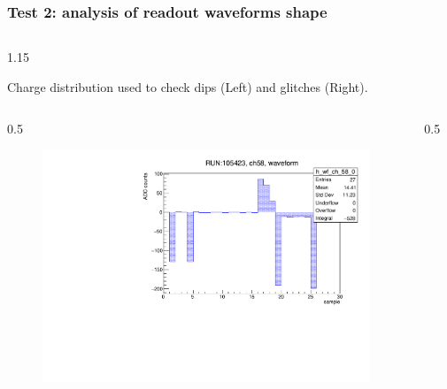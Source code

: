 \documentclass{beamer}
\begin{document}
\begin{frame}
    \frametitle{Test 2: analysis of readout waveforms shape}
            \vspace{-4mm}
        \begin{columns}
    \begin{column}{1.15\framewidth}
        \setlength{\leftmargini}{1.2em}
     \begin{itemize}
    {\small \item Charge distribution used to check dips (Left) and glitches (Right).}
      \end{itemize}
        \end{column}
        \end{columns}
    
         \vspace{-3mm}
        \begin{columns}
    \begin{column}{0.5\framewidth}
             \begin{figure}[!h]
          \centering
          \hspace*{-1em}
        \includegraphics[width=0.95\columnwidth]{figures/pdf/wf_ch58_1.pdf} 
         \label{fig:normalhits}
    \end{figure}
    \end{column}
    \begin{column}{0.5\framewidth}
          \begin{figure}[!h]
          \centering
                \hspace*{-1em}

\end{figure}
\end{column}
\end{columns}
\end{frame}
\end{document}
